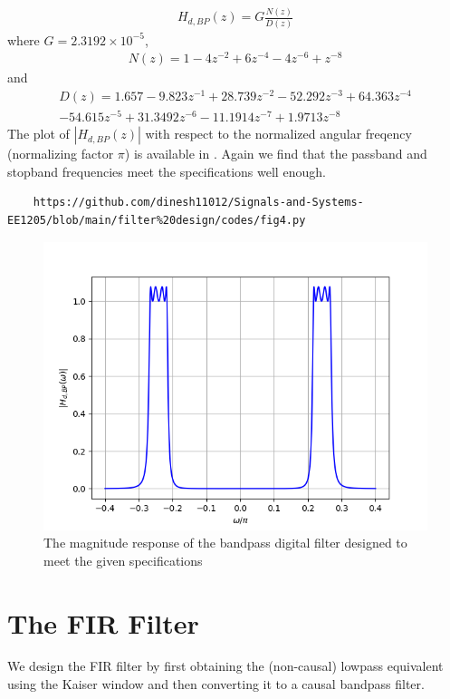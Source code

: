 \documentclass{article}
\begin{document}
\begin{eqnarray}
H_{d,BP}(z) = G \frac{N(z)}{D(z)}
\end{eqnarray}
where $G = 2.3192 \times 10^{-5}$,
\begin{eqnarray}
N(z)=  1 - 4 z^{-2} + 6 z^{-4} - 4z^{-6} + z^{-8} 
\end{eqnarray}
and
\begin{eqnarray}
D(z) = 1.657 -9.823z^{-1} + 28.739z^{-2}  -52.292z^{-3}+  64.363z^{-4}\nonumber \\
  -54.615z^{-5}+   31.3492z^{-6}  -11.1914z^{-7} +   1.9713z^{-8}
\end{eqnarray}
The plot of $|H_{d,BP}(z)|$ with respect to the normalized angular freqency (normalizing factor $\pi$) is available in .  Again we
find that the passband and stopband frequencies meet the specifications well enough.
\begin{lstlisting}
	https://github.com/dinesh11012/Signals-and-Systems-EE1205/blob/main/filter%20design/codes/fig4.py
\end{lstlisting}
\begin{figure}[H]
\includegraphics[width = \columnwidth]{figs/fig4.png}
\caption{The magnitude response of the bandpass digital filter designed to meet the given specifications} 
\label{fig5}
\end{figure}

\section{The FIR Filter}
We design the FIR filter by first obtaining the (non-causal) lowpass equivalent using the Kaiser window
and then
converting it to a causal bandpass filter.
\end{document}
